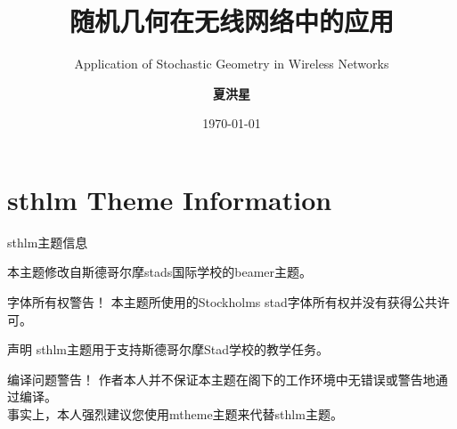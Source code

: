 \documentclass[newPxFont,sthlmFooter]{beamer}
\title{随机几何在无线网络中的应用}
\subtitle{Application of Stochastic Geometry in Wireless Networks}
\author{\textbf{夏洪星}}
\institute{\small{xiahongxing@gmail.com}}
\date{\today}
\begin{document}
%
%

\maketitle


%
%

\section*{sthlm Theme Information}


\begin{frame}[c]{sthlm主题信息}

{本主题修改自斯德哥尔摩stads国际学校的beamer主题}。

\vspace{1em}

\begin{alertblock}{字体所有权警告！}
本主题所使用的Stockholms stad字体所有权并没有获得公共许可。 
\end{alertblock}

\end{frame}


\begin{frame}[c]{声明}
sthlm主题用于支持斯德哥尔摩Stad学校的教学任务。 \\

\vspace{1em}

\begin{alertblock}{编译问题警告！}
作者本人并不保证本主题在阁下的工作环境中无错误或警告地通过编译。 \\
\vspace{1em}
事实上，本人强烈建议您使用mtheme主题来代替sthlm主题。
\end{alertblock}

\end{frame}
\end{document}
